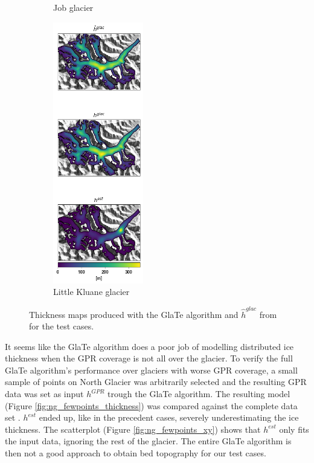 \documentclass[a4, 12pt]{article}
\begin{document}
\begin{landscape}
\begin{figure}[h!]
{\begin{subfigure}{0.225\linewidth}
\caption{Job glacier}
\label{fig:fglate_job_thickness}
\end{subfigure}
\hfill
\begin{subfigure}{0.225\linewidth}
\centering
\includegraphics[height=4.5in]{../imgs/little Kluane glacier/farinotti_glate_thickness_all_models.png}
\caption{Little Kluane glacier}
\label{fig:fglate_lk_thickness}
\end{subfigure}
}
\caption{Thickness maps produced with the GlaTe algorithm and $\hat{h}^{glac}$ from \citet{farinotti2019consensus} for the test cases.}
\label{fig:fglate_thickness}
\end{figure}
\end{landscape}
\FloatBarrier
It seems like the GlaTe algorithm does a poor job of modelling distributed ice thickness when the GPR coverage is not all over the glacier. To verify the full GlaTe algorithm's performance over glaciers with worse GPR coverage, a small sample of points on North Glacier was arbitrarily selected and the resulting GPR data was set as input $h^{GPR}$ trough the GlaTe algorithm. The resulting model (Figure \ref{fig:ng_fewpoints_thickness}) was compared against the complete data set . $h^{est}$ ended up, like in the precedent cases, severely underestimating the ice thickness. The scatterplot (Figure \ref{fig:ng_fewpoints_xy}) shows that $h^{est}$ only fits the input data, ignoring the rest of the glacier. The entire GlaTe algorithm is then not a good approach to obtain bed topography for our test cases.
\end{document}
